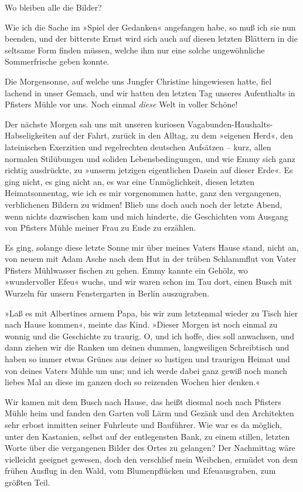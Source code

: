 Wo bleiben alle die Bilder?

Wie ich die Sache im »Spiel der Gedanken« angefangen habe, so muß
ich sie nun beenden, und der bitterste Ernst wird sich auch auf
diesen letzten Blättern in die seltsame Form finden müssen, welche
ihm nur eine solche ungewöhnliche Sommerfrische geben konnte.

Die Morgensonne, auf welche uns Jungfer Christine hingewiesen
hatte, fiel lachend in unser Gemach, und wir hatten den letzten Tag
unseres Aufenthalts in Pfisters Mühle vor uns. Noch einmal
\emph{diese} Welt in voller Schöne!

Der nächste Morgen sah uns mit unseren kuriosen
Vagabunden-Haushalts-Habseligkeiten auf der Fahrt, zurück in den
Alltag, zu dem »eigenen Herd«, den lateinischen Exerzitien und
regelrechten deutschen Aufsätzen – kurz, allen normalen Stilübungen
und soliden Lebensbedingungen, und wie Emmy sich ganz richtig
ausdrückte, zu »unserm jetzigen eigentlichen Dasein auf dieser
Erde«. Es ging nicht, es ging nicht an, es war eine Unmöglichkeit,
diesen letzten Heimatsonnentag, wie ich es mir vorgenommen hatte,
ganz den vergangenen, verblichenen Bildern zu widmen! Blieb uns
doch auch noch der letzte Abend, wenn nichts dazwischen kam und
mich hinderte, die Geschichten vom Ausgang von Pfisters Mühle
meiner Frau zu Ende zu erzählen.

Es ging, solange diese letzte Sonne mir über meines Vaters Hause
stand, nicht an, von neuem mit Adam Asche nach dem Hut in der
trüben Schlammflut von Vater Pfisters Mühlwasser fischen zu gehen.
Emmy kannte ein Gehölz, wo »wundervoller Efeu« wuchs, und wir waren
schon im Tau dort, einen Busch mit Wurzeln für unsern Fenstergarten
in Berlin auszugraben.

»Laß es mit Albertines armem Papa, bis wir zum letztenmal wieder zu
Tisch hier nach Hause kommen«, meinte das Kind. »Dieser Morgen ist
noch einmal zu wonnig und die Geschichte zu traurig. O, und ich
hoffe, dies soll anwachsen, und dann ziehen wir die Ranken um
deinen dummen, langweiligen Schreibtisch und haben so immer etwas
Grünes aus deiner so lustigen und traurigen Heimat und von deines
Vaters Mühle um uns; und ich werde dabei ganz gewiß noch manch
liebes Mal an diese im ganzen doch so reizenden Wochen hier
denken.«

Wir kamen mit dem Busch nach Hause, das heißt diesmal noch nach
Pfisters Mühle heim und fanden den Garten voll Lärm und Gezänk und
den Architekten sehr erbost inmitten seiner Fuhrleute und
Bauführer. Wie war es da möglich, unter den Kastanien, selbst auf
der entlegensten Bank, zu einem stillen, letzten Worte über die
vergangenen Bilder des Ortes zu gelangen? Der Nachmittag wäre
vielleicht geeignet gewesen, doch den verschlief mein Weibchen,
ermüdet von dem frühen Ausflug in den Wald, vom Blumenpflücken und
Efeuausgraben, zum größten Teil.

